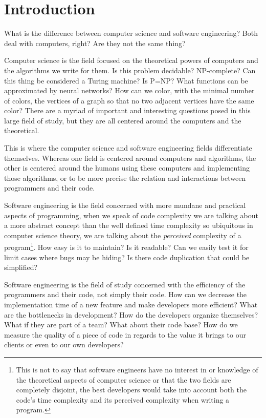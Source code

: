 
\chapter{Introduction}
\label{chap:intro}



What is the difference between computer science and software engineering? Both deal with computers, right? Are they not the same thing?

Computer science is the field focused on the theoretical powers of computers and the algorithms we write for them. Is this problem decidable? NP-complete? Can this thing be considered a Turing machine? Is P=NP? What functions can be approximated by neural networks? How can we color, with the minimal number of colors,  the vertices of a graph so that no two adjacent vertices have the same color? There are a myriad of important and interesting questions posed in this large field of study, but they are all centered around the computers and the theoretical.

This is where the computer science and software engineering fields differentiate themselves. Whereas one field is centered around computers and algorithms, the other is centered around the humans using these computers and implementing those algorithms, or to be more precise the relation and interactions between programmers and their code.

Software engineering is the field concerned with more mundane and practical aspects of programming, when we speak of code complexity we are talking about a more abstract concept than the well defined time complexity so ubiquitous in computer science theory, we are talking about the \textit{perceived} complexity of a program\footnote{This is not to say that software engineers have no interest in or knowledge of the theoretical aspects of computer science or that the two fields are completely disjoint, the best developers would take into account both the code's time complexity and its perceived complexity when writing a program.}. How easy is it to maintain? Is it readable? Can we easily test it for limit cases where bugs may be hiding? Is there code duplication that could be simplified?


Software engineering is the field of study concerned with the efficiency of the programmers and their code, not simply their code. How can we decrease the implementation time of a new feature and make developers more efficient? What are the bottlenecks in development? How do the developers organize themselves? What if they are part of a team? What about their code base? How do we measure the quality of a piece of code in regards to the value it brings to our clients or even to our own developers?

